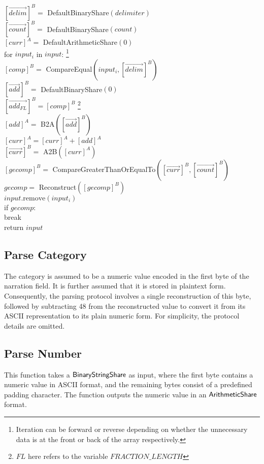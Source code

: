 \begin{protocol}
	${[\vec{delim}]^B} =$ DefaultBinaryShare$(delimiter)$\\
	${[\vec{count}]^B} =$ DefaultBinaryShare$(count)$\\
	${[curr]^A} =$ DefaultArithmeticShare$(0)$\\
	for $input_i$ in $input$: \footnote{Iteration can be forward or reverse depending on whether the unnecessary data is at the front or back of the array respectively.}\\
	\indent ${[comp]^B} =$ CompareEqual$(input_i, [\vec{delim}]^B)$\\
	\indent ${[\vec{add}]^B} =$ DefaultBinaryShare$(0)$\\
	\indent ${[\vec{add_{FL}}]^B} = [comp]^B$ \footnote{$FL$ here refers to the variable $FRACTION\_LENGTH$}\\
	\indent ${[add]^A} =$ B2A$([\vec{add}]^B)$\\
	\indent ${[curr]^A} = {[curr]^A} + {[add]^A}$\\
	\indent ${[\vec{curr}]^B} = $ A2B$({[curr]^A})$\\
	\indent ${[gecomp]^B} =$ CompareGreaterThanOrEqualTo$([\vec{curr}]^B, [\vec{count}]^B)$\\
	\indent $gecomp =$ Reconstruct$({[gecomp]^B})$\\
	\indent $input.\text{remove}(input_i)$\\
        \indent if $gecomp$:\\
        \indent \indent break\\
        return $input$
\end{protocol}

\subsection{Parse Category}
\label{sec:parse_category}

The category is assumed to be a numeric value encoded in the first byte of the narration field. It is further assumed that it is stored in plaintext form. Consequently, the parsing protocol involves a single reconstruction of this byte, followed by subtracting 48 from the reconstructed value to convert it from its ASCII representation to its plain numeric form. For simplicity, the protocol details are omitted.

\subsection{Parse Number}
\label{sec:parse_number}
This function takes a ${\mathsf{BinaryStringShare}}$ as input, where the first byte contains a numeric value in ASCII format, and the remaining bytes consist of a predefined padding character. The function outputs the numeric value in an ${\mathsf{ArithmeticShare}}$ format.

